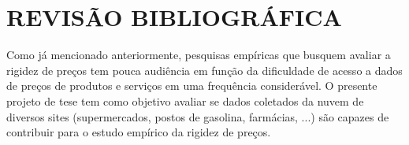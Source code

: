 \documentclass[twoside,a4paper,11pt]{report}
\newcommand{\subde}{\emph{Clypeaster subdepressus}}
\newcommand{\subsus}{\emph{C.~subdepressus}}
\begin{document}
% 
% 
% 
% 
\pagestyle{empty}
\cleardoublepage
\pagestyle{fancy}

\chapter{REVISÃO BIBLIOGRÁFICA}\label{cap2}

Como já mencionado anteriormente, pesquisas empíricas que busquem avaliar a rigidez de preços tem pouca audiência em função da dificuldade de acesso a dados de preços de produtos e serviços em uma frequência considerável. O presente projeto de tese tem como objetivo avaliar se dados coletados da nuvem de diversos sites (supermercados, postos de gasolina, farmácias, ...) são capazes de contribuir para o estudo empírico da rigidez de preços. 
\end{document}
